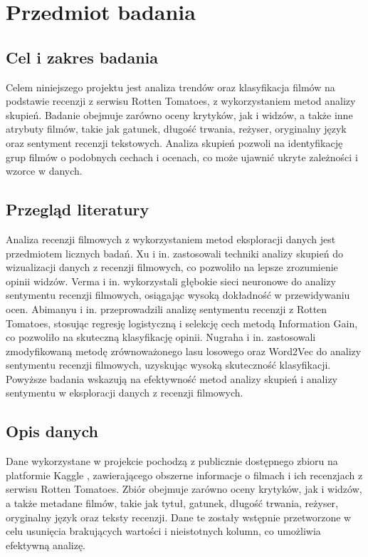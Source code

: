 \documentclass[a4paper,12pt]{article}
\begin{document}
\section{Przedmiot badania}

\subsection{Cel i zakres badania}

Celem niniejszego projektu jest analiza trendów oraz klasyfikacja filmów na podstawie recenzji z serwisu Rotten Tomatoes, z wykorzystaniem metod analizy skupień. Badanie obejmuje zarówno oceny krytyków, jak i widzów, a także inne atrybuty filmów, takie jak gatunek, długość trwania, reżyser, oryginalny język oraz sentyment recenzji tekstowych. Analiza skupień pozwoli na identyfikację grup filmów o podobnych cechach i ocenach, co może ujawnić ukryte zależności i wzorce w danych.

\subsection{Przegląd literatury}

Analiza recenzji filmowych z wykorzystaniem metod eksploracji danych jest przedmiotem licznych badań. Xu i in. \cite{xu2022} zastosowali techniki analizy skupień do wizualizacji danych z recenzji filmowych, co pozwoliło na lepsze zrozumienie opinii widzów. Verma i in. \cite{verma2021} wykorzystali głębokie sieci neuronowe do analizy sentymentu recenzji filmowych, osiągając wysoką dokładność w przewidywaniu ocen. Abimanyu i in. \cite{abimanyu2023} przeprowadzili analizę sentymentu recenzji z Rotten Tomatoes, stosując regresję logistyczną i selekcję cech metodą Information Gain, co pozwoliło na skuteczną klasyfikację opinii. Nugraha i in. \cite{nugraha2023} zastosowali zmodyfikowaną metodę zrównoważonego lasu losowego oraz Word2Vec do analizy sentymentu recenzji filmowych, uzyskując wysoką skuteczność klasyfikacji. Powyższe badania wskazują na efektywność metod analizy skupień i analizy sentymentu w eksploracji danych z recenzji filmowych.

\subsection{Opis danych}

Dane wykorzystane w projekcie pochodzą z publicznie dostępnego zbioru na platformie Kaggle \cite{kaggle2025}, zawierającego obszerne informacje o filmach i ich recenzjach z serwisu Rotten Tomatoes. Zbiór obejmuje zarówno oceny krytyków, jak i widzów, a także metadane filmów, takie jak tytuł, gatunek, długość trwania, reżyser, oryginalny język oraz teksty recenzji. Dane te zostały wstępnie przetworzone w celu usunięcia brakujących wartości i nieistotnych kolumn, co umożliwia efektywną analizę.
\end{document}
